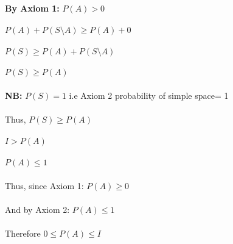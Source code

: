 \documentclass{article}
\begin{document}
\textbf{By Axiom 1:} $P(A) > 0$ \\ \\
$P(A) + P(S \setminus A) \geq P(A) + 0$
\\ \\
$P(S) \geq P(A) + P(S \setminus A)$
\\ \\
$P(S) \geq P(A)$
\\ \\
\textbf{NB:} $P(S) = 1$ { i.e Axiom 2 {probability of simple space= 1}}
\\ \\
Thus, $P(S) \geq P(A)$
\\ \\ 
$I > P(A)$ 
\\ \\
$P(A) \leq 1$
\\ \\ 
Thus, since Axiom 1: $P(A) \geq 0$ 
\\ \\
And by Axiom 2: $P(A) \leq 1$ 
\\ \\
Therefore $0 \leq P(A) \leq I$\\
\end{document}
